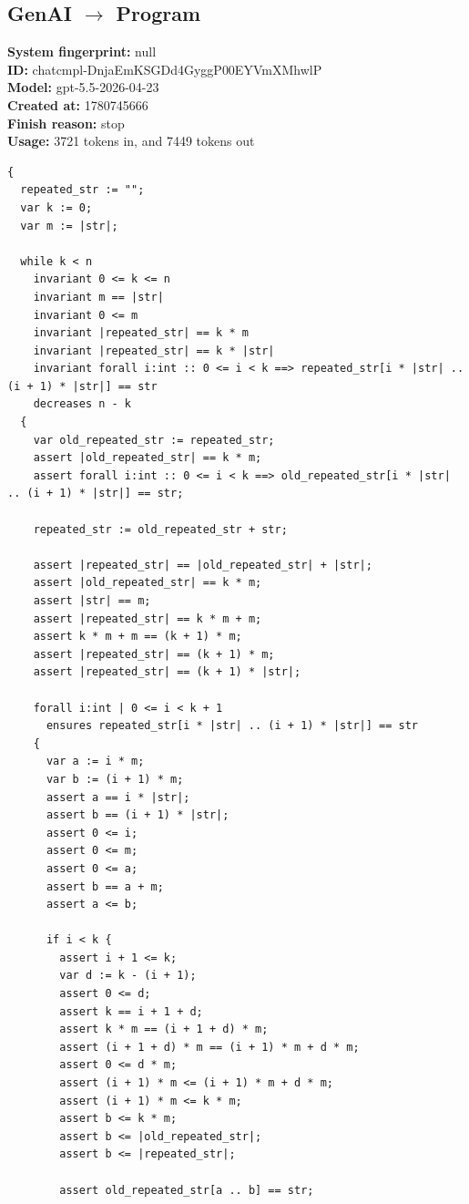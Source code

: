 \documentclass{article}
\begin{document}
\subsection*{GenAI $\rightarrow$ Program}
\textbf{System fingerprint: }null
\\\textbf{ID: }chatcmpl-DnjaEmKSGDd4GyggP00EYVmXMhwlP
\\\textbf{Model: }gpt-5.5-2026-04-23
\\\textbf{Created at: }1780745666
\\\textbf{Finish reason: }stop
\\\textbf{Usage: }3721 tokens in, and 7449 tokens out
\begin{lstlisting}
{
  repeated_str := "";
  var k := 0;
  var m := |str|;

  while k < n
    invariant 0 <= k <= n
    invariant m == |str|
    invariant 0 <= m
    invariant |repeated_str| == k * m
    invariant |repeated_str| == k * |str|
    invariant forall i:int :: 0 <= i < k ==> repeated_str[i * |str| .. (i + 1) * |str|] == str
    decreases n - k
  {
    var old_repeated_str := repeated_str;
    assert |old_repeated_str| == k * m;
    assert forall i:int :: 0 <= i < k ==> old_repeated_str[i * |str| .. (i + 1) * |str|] == str;

    repeated_str := old_repeated_str + str;

    assert |repeated_str| == |old_repeated_str| + |str|;
    assert |old_repeated_str| == k * m;
    assert |str| == m;
    assert |repeated_str| == k * m + m;
    assert k * m + m == (k + 1) * m;
    assert |repeated_str| == (k + 1) * m;
    assert |repeated_str| == (k + 1) * |str|;

    forall i:int | 0 <= i < k + 1
      ensures repeated_str[i * |str| .. (i + 1) * |str|] == str
    {
      var a := i * m;
      var b := (i + 1) * m;
      assert a == i * |str|;
      assert b == (i + 1) * |str|;
      assert 0 <= i;
      assert 0 <= m;
      assert 0 <= a;
      assert b == a + m;
      assert a <= b;

      if i < k {
        assert i + 1 <= k;
        var d := k - (i + 1);
        assert 0 <= d;
        assert k == i + 1 + d;
        assert k * m == (i + 1 + d) * m;
        assert (i + 1 + d) * m == (i + 1) * m + d * m;
        assert 0 <= d * m;
        assert (i + 1) * m <= (i + 1) * m + d * m;
        assert (i + 1) * m <= k * m;
        assert b <= k * m;
        assert b <= |old_repeated_str|;
        assert b <= |repeated_str|;

        assert old_repeated_str[a .. b] == str;


\end{lstlisting}
\end{document}
